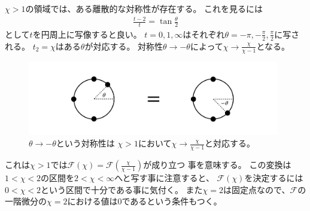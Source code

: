 $\chi > 1$の領域では、ある離散的な対称性が存在する。
これを見るには
\begin{align}
	\frac{t-2}{t} = \tan \frac{\theta}{2}
\end{align}
として$t$を円周上に写像すると良い。
$t = 0, 1, \infty$はそれぞれ$\theta = -\pi, -\frac{\pi}{2}, \frac{\pi}{2}$に写される。
$t_2 = \chi$はある$\theta$が対応する。
対称性$\theta \to -\theta$によって$\chi \to \frac{\chi}{\chi - 1}$となる。
\begin{figure}[ht]
	\centering
	\includegraphics[width=11cm]{figures/circle}
	\caption{$\theta \to -\theta$という対称性は
		$\chi > 1$において$\chi \to \frac{\chi}{\chi - 1}$と対応する。}
\end{figure}

これは$\chi > 1$では$\mathcal{F}(\chi) = \mathcal{F}(\frac{\chi}{\chi - 1})$が成り立つ
事を意味する。
この変換は$1 < \chi < 2$の区間を$2 < \chi < \infty$へと写す事に注意すると、
$\mathcal{F}(\chi)$を決定するには$0 < \chi < 2$という区間で十分である事に気付く。
また$\chi = 2$は固定点なので、$\mathcal{F}$の一階微分の$\chi = 2$における値は0であるという条件もつく。

